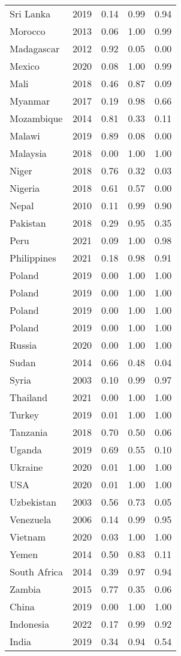 \begin{longtable}[t]{lrrrr}
Sri Lanka & 2019 & 0.14 & 0.99 & 0.94\\
Morocco & 2013 & 0.06 & 1.00 & 0.99\\
Madagascar & 2012 & 0.92 & 0.05 & 0.00\\
Mexico & 2020 & 0.08 & 1.00 & 0.99\\
Mali & 2018 & 0.46 & 0.87 & 0.09\\
Myanmar & 2017 & 0.19 & 0.98 & 0.66\\
Mozambique & 2014 & 0.81 & 0.33 & 0.11\\
Malawi & 2019 & 0.89 & 0.08 & 0.00\\
Malaysia & 2018 & 0.00 & 1.00 & 1.00\\
Niger & 2018 & 0.76 & 0.32 & 0.03\\
Nigeria & 2018 & 0.61 & 0.57 & 0.00\\
Nepal & 2010 & 0.11 & 0.99 & 0.90\\
Pakistan & 2018 & 0.29 & 0.95 & 0.35\\
Peru & 2021 & 0.09 & 1.00 & 0.98\\
Philippines & 2021 & 0.18 & 0.98 & 0.91\\
Poland & 2019 & 0.00 & 1.00 & 1.00\\
Poland & 2019 & 0.00 & 1.00 & 1.00\\
Poland & 2019 & 0.00 & 1.00 & 1.00\\
Poland & 2019 & 0.00 & 1.00 & 1.00\\
Russia & 2020 & 0.00 & 1.00 & 1.00\\
Sudan & 2014 & 0.66 & 0.48 & 0.04\\
Syria & 2003 & 0.10 & 0.99 & 0.97\\
Thailand & 2021 & 0.00 & 1.00 & 1.00\\
Turkey & 2019 & 0.01 & 1.00 & 1.00\\
Tanzania & 2018 & 0.70 & 0.50 & 0.06\\
Uganda & 2019 & 0.69 & 0.55 & 0.10\\
Ukraine & 2020 & 0.01 & 1.00 & 1.00\\
USA & 2020 & 0.01 & 1.00 & 1.00\\
Uzbekistan & 2003 & 0.56 & 0.73 & 0.05\\
Venezuela & 2006 & 0.14 & 0.99 & 0.95\\
Vietnam & 2020 & 0.03 & 1.00 & 1.00\\
Yemen & 2014 & 0.50 & 0.83 & 0.11\\
South Africa & 2014 & 0.39 & 0.97 & 0.94\\
Zambia & 2015 & 0.77 & 0.35 & 0.06\\
China & 2019 & 0.00 & 1.00 & 1.00\\
Indonesia & 2022 & 0.17 & 0.99 & 0.92\\
India & 2019 & 0.34 & 0.94 & 0.54\\
\bottomrule
\end{longtable}
